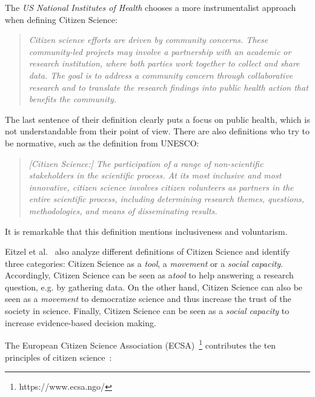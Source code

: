 The \textit{US National Institutes of Health} chooses a more instrumentalist approach when defining Citizen Science:
\begin{quote}
\textit{Citizen science efforts are driven by community concerns. These community-led projects may involve a partnership with an academic or research institution, where both parties work together to collect and share data. The goal is to address a community concern through collaborative research and to translate the research findings into public health action that benefits the community.}
\end{quote}
The last sentence of their definition clearly puts a focus on public health, which is not understandable from their point of view.
There are also definitions who try to be normative, such as the definition from UNESCO:
\begin{quote}
\textit{[Citizen Science:] The participation of a range of non-scientific stakeholders in the scientific process. At its most inclusive and most innovative, citizen science involves citizen volunteers as partners in the entire scientific process, including determining research themes, questions, methodologies, and means of disseminating results.}
\end{quote}
It is remarkable that this definition mentions inclusiveness and voluntarism.

Eitzel et al.~\cite{eitzel2017citizen} also analyze different definitions of Citizen Science and identify three categories: Citizen Science as a \textit{tool}, a \textit{movement} or a \textit{social capacity}.
Accordingly, Citizen Science can be seen as a\textit{tool} to help answering a research question, e.g. by gathering data.
On the other hand, Citizen Science can also be seen as a \textit{movement} to democratize science and thus increase the trust of the society in science.
Finally, Citizen Science can be seen as a \textit{social capacity} to increase evidence-based decision making.

The European Citizen Science Association (ECSA)~\footnote{https://www.ecsa.ngo/} contributes the ten principles of citizen science~\cite{ecsa2015ten}:

